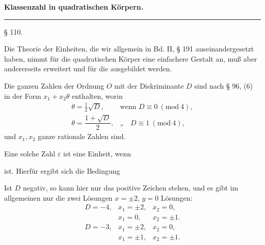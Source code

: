 \begin{center}

\vspace{1em}

\textbf{Klassenzahl in quadratischen K\"orpern.}

\vspace{0.5em}
\rule{4cm}{0.4pt}
\end{center}

\begin{center}
§ 110. 
\end{center}

Die Theorie der Einheiten, die wir allgemein in Bd. II, § 191
auseinandergesetzt haben, nimmt für die quadratischen Körper
eine einfachere Gestalt an, mu\ss{} aber andererseits erweitert und
für die  ausgebildet werden.

Die ganzen Zahlen der Ordnung $O$ mit der Diskriminante $D$
sind nach § 96, (6) in der Form $x_1 + x_2\theta$ enthalten, worin
\[
\begin{array}{ll}
\theta = \tfrac{1}{2}\sqrt{D}, & \text{wenn } D \equiv 0 \ (\mathrm{mod}\ 4),\\[4pt]
\theta = \dfrac{1+\sqrt{D}}{2}, & \text{„}\quad D \equiv 1 \ (\mathrm{mod}\ 4),
\end{array}
\]
und $x_1, x_2$ ganze rationale Zahlen sind.

Eine solche Zahl $\varepsilon$ ist eine Einheit, wenn


ist. Hierfür ergibt sich die Bedingung


Ist $D$ negativ, so kann hier nur das positive Zeichen stehen,
und es gibt im allgemeinen nur die zwei Lösungen $x = \pm 2$,
$y = 0$ %
Lösungen:
\[
\begin{array}{lll}
D = -4, & x_1 = \pm 2, & x_2 = 0,\\
 & x_1 = 0, & x_2 = \pm 1.\\
D = -3, & x_1 = \pm 2, & x_2 = 0,\\
 & x_1 = \pm 1, & x_2 = \pm 1.
\end{array}
\]
